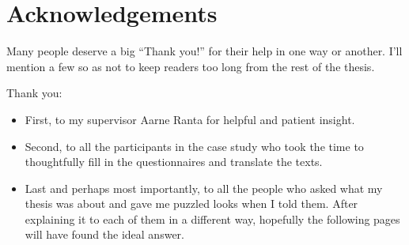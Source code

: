 

\bigskip


\begingroup

\let\clearpage\relax
\let\cleardoublepage\relax
\let\cleardoublepage\relax

\chapter*{Acknowledgements} %

\noindent Many people deserve a big ``Thank you!'' for their help in one way or another. I'll mention a few so as not to keep readers too long from the rest of the thesis.

\medskip

\noindent Thank you:

\begin{itemize}
    \item First, to my supervisor Aarne Ranta for helpful and patient insight.

    \item Second, to all the participants in the case study who took the time to thoughtfully fill in the questionnaires and translate the texts.

    \item Last and perhaps most importantly, to all the people who asked what my thesis was about and gave me puzzled looks when I told them. After explaining it to each of them in a different way, hopefully the following pages will have found the ideal answer.
\end{itemize}    


\endgroup
